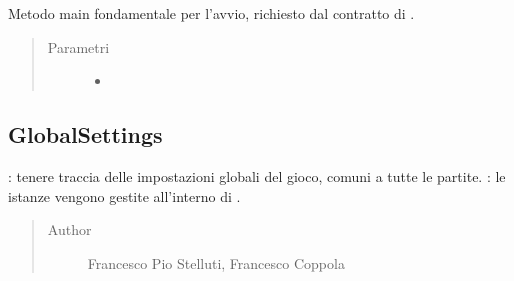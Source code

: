 \documentclass[letterpaper,10pt,italian,openany,oneside]{sphinxmanual}
\begin{document}
\begin{fulllineitems}
\label{\detokenize{source/it/unicam/cs/pa/mastermind/gamecore/ConsoleMainManager:it.unicam.cs.pa.mastermind.gamecore.ConsoleMainManager.main(String__)}}
Metodo main fondamentale per l’avvio, richiesto dal contratto di .
\begin{quote}\begin{description}
\item[{Parametri}] \leavevmode\begin{itemize}
\item {} 
 \textendash{} 

\end{itemize}

\end{description}\end{quote}

\end{fulllineitems}



\subsection{GlobalSettings}
\label{\detokenize{source/it/unicam/cs/pa/mastermind/gamecore/GlobalSettings:globalsettings}}\label{\detokenize{source/it/unicam/cs/pa/mastermind/gamecore/GlobalSettings::doc}}

\begin{fulllineitems}
\label{\detokenize{source/it/unicam/cs/pa/mastermind/gamecore/GlobalSettings:it.unicam.cs.pa.mastermind.gamecore.GlobalSettings}}
: tenere traccia delle impostazioni globali del gioco, comuni a tutte le partite. : le istanze vengono gestite all’interno di .
\begin{quote}\begin{description}
\item[{Author}] \leavevmode
Francesco Pio Stelluti, Francesco Coppola

\end{description}\end{quote}

\end{fulllineitems}
\end{document}
